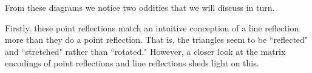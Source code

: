\documentclass[12pt]{article}
\theoremstyle{plain}
\theoremstyle{definition}
\begin{document}

From these diagrams we notice two oddities that we will discuss in turn. 

Firstly, these point reflections match an intuitive conception of a line reflection more than they do a point reflection. That is, the triangles seem to be ``reflected" and ``stretched" rather than ``rotated." However, a closer look at the matrix encodings of point reflections and line reflections sheds light on this. 
\end{document}
